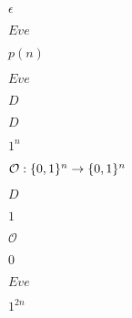 \documentclass[10pt]{book}
\begin{document}
\begin{mdSnippets}
\begin{mdInlineSnippet}[92e4da341fe8f4cd46192f21b6ff3aa7]
$\epsilon$\end{mdInlineSnippet}%
\begin{mdInlineSnippet}%
$Eve$\end{mdInlineSnippet}%
\begin{mdInlineSnippet}%
$p(n)$\end{mdInlineSnippet}%
\begin{mdInlineSnippet}%
$Eve$\end{mdInlineSnippet}%
\begin{mdInlineSnippet}[f623e75af30e62bbd73d6df5b50bb7b5]%
$D$\end{mdInlineSnippet}%
\begin{mdInlineSnippet}[f623e75af30e62bbd73d6df5b50bb7b5]%
$D$\end{mdInlineSnippet}%
\begin{mdInlineSnippet}%
$1^n$\end{mdInlineSnippet}%
\begin{mdInlineSnippet}[76e59e9a70728f3e616bf4203c40434c]%
$\mathcal{O}: \{0,1\}^n \to \{0,1\}^n$\end{mdInlineSnippet}%
\begin{mdInlineSnippet}[f623e75af30e62bbd73d6df5b50bb7b5]%
$D$\end{mdInlineSnippet}%
\begin{mdInlineSnippet}[c4ca4238a0b923820dcc509a6f75849b]%
$1$\end{mdInlineSnippet}%
\begin{mdInlineSnippet}[c739e7b1285679250be773ba8e183209]%
$\mathcal{O}$\end{mdInlineSnippet}%
\begin{mdInlineSnippet}%
$0$\end{mdInlineSnippet}%
\begin{mdInlineSnippet}%
$Eve$\end{mdInlineSnippet}%
\begin{mdInlineSnippet}[0bb2a9040d090145aff6b7570cb4f7c1]%
$1^{2n}$\end{mdInlineSnippet}%

\end{mdSnippets}
\end{document}

